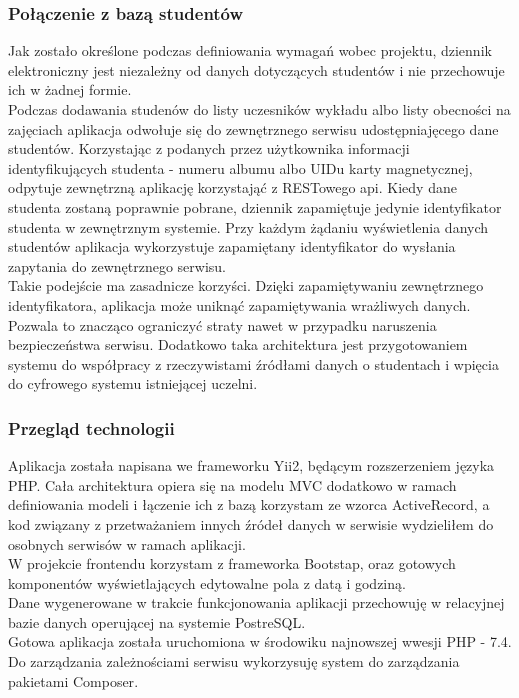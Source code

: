 \documentclass[declaration,shortabstract, mgr]{iithesis}
\begin{document}
\subsubsection{Połączenie z bazą studentów}
\indent Jak zostało określone podczas definiowania wymagań wobec projektu, dziennik elektroniczny jest niezależny od danych dotyczących studentów i nie przechowuje ich w żadnej formie.\\
\indent  Podczas dodawania studenów do listy uczesników wykładu albo listy obecności na zajęciach aplikacja odwołuje się do zewnętrznego serwisu udostępniajęcego dane studentów.  Korzystając z podanych przez użytkownika informacji identyfikujących studenta - numeru albumu albo UIDu karty magnetycznej, odpytuje zewnętrzną aplikację korzystająć z RESTowego api. Kiedy dane studenta zostaną poprawnie pobrane, dziennik zapamiętuje jedynie identyfikator studenta w zewnętrznym systemie. Przy każdym żądaniu wyświetlenia danych studentów aplikacja wykorzystuje zapamiętany identyfikator do wysłania zapytania do zewnętrznego serwisu. \\
\indent Takie podejście ma zasadnicze korzyści. Dzięki zapamiętywaniu zewnętrznego identyfikatora, aplikacja może uniknąć zapamiętywania wrażliwych danych. Pozwala to znacząco ograniczyć straty nawet w przypadku naruszenia bezpieczeństwa serwisu. Dodatkowo taka architektura jest przygotowaniem systemu do współpracy z rzeczywistami źródłami danych o studentach i wpięcia do cyfrowego systemu istniejącej uczelni.\\
\subsubsection{Przegląd technologii}
\indent Aplikacja została napisana we frameworku Yii2\cite{yii}, będącym rozszerzeniem języka PHP. Cała architektura opiera się na modelu MVC dodatkowo w ramach definiowania modeli i łączenie ich z bazą korzystam ze wzorca ActiveRecord, a kod związany z przetważaniem innych źródeł danych w serwisie wydzieliłem do osobnych serwisów w ramach aplikacji.\\
\indent W projekcie frontendu korzystam z frameworka Bootstap\cite{bootstrap}, oraz gotowych komponentów\cite{kartik}\cite{da1}\cite{da2} wyświetlających edytowalne pola z datą i godziną. \\
\indent Dane wygenerowane w trakcie funkcjonowania aplikacji przechowuję w relacyjnej bazie danych operującej na systemie PostreSQL\cite{psql}.\\
\indent Gotowa aplikacja została uruchomiona w środowiku najnowszej wwesji PHP - 7.4.\\
\indent Do zarządzania zależnościami serwisu wykorzysuję system do zarządzania pakietami Composer\cite{composer}.
\end{document}
